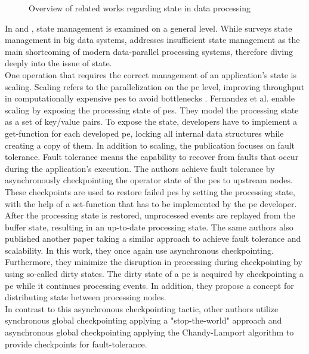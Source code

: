 \begin{figure}[H]
\graphicspath{{./figures/code/}}

\caption{Overview of related works regarding state in data processing}
\label{fOverviewLiteratureState}
\end{figure}

In \cite{CastroFernandez.2016} and \cite{To.2017}, state management is examined on a general level. While \cite{To.2017} surveys state management in big data systems, \cite{CastroFernandez.2016} addresses insufficient state management as the main shortcoming of modern data-parallel processing systems, therefore diving deeply into the issue of state.\\
One operation that requires the correct management of an application's state is scaling. Scaling refers to the parallelization on the \gls{pe} level, improving throughput in computationally expensive \gls{pe}s to avoid bottlenecks \cite{CastroFernandez.2013}. Fernandez et al. \cite{CastroFernandez.2013} enable scaling by exposing the processing state of \gls{pe}s. They model the processing state as a set of key/value pairs. To expose the state, developers have to implement a get-function for each developed \gls{pe}, locking all internal data structures while creating a copy of them. In addition to scaling, the publication focuses on fault tolerance. Fault tolerance means the capability to recover from faults that occur during the application's execution. The authors achieve fault tolerance by asynchronously checkpointing the operator state of the \gls{pe}s to upstream nodes. These checkpoints are used to restore failed \gls{pe}s by setting the processing state, with the help of a set-function that has to be implemented by the \gls{pe} developer. After the processing state is restored, unprocessed events are replayed from the buffer state, resulting in an up-to-date processing state. The same authors also published another paper \cite{Gibson.2014} taking a similar approach to achieve fault tolerance and scalability. In this work, they once again use asynchronous checkpointing. Furthermore, they minimize the disruption in processing during checkpointing by using so-called dirty states. The dirty state of a \gls{pe} is acquired by checkpointing a \gls{pe} while it continues processing events. In addition, they propose a concept for distributing state between processing nodes.\\
In contrast to this asynchronous checkpointing tactic, other authors utilize synchronous global checkpointing applying a "stop-the-world" approach \cite{Murray.2013} and asynchronous global checkpointing applying the Chandy-Lamport algorithm \cite{Chandy.1985, Power.2010} to provide checkpoints for fault-tolerance.\\
